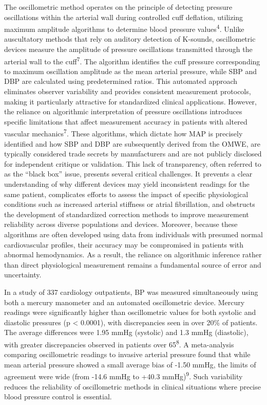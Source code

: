 \documentclass[
  12pt,
  letterpaper,
  openany,
  oneside]{book}
\begin{document}
The oscillometric method operates on the principle of detecting pressure
oscillations within the arterial wall during controlled cuff deflation,
utilizing maximum amplitude algorithms to determine blood pressure
values\textsuperscript{4}. Unlike auscultatory methods that rely on
auditory detection of K-sounds, oscillometric devices measure the
amplitude of pressure oscillations transmitted through the arterial wall
to the cuff\textsuperscript{7}. The algorithm identifies the cuff
pressure corresponding to maximum oscillation amplitude as the mean
arterial pressure, while SBP and DBP are calculated using predetermined
ratios. This automated approach eliminates observer variability and
provides consistent measurement protocols, making it particularly
attractive for standardized clinical applications. However, the reliance
on algorithmic interpretation of pressure oscillations introduces
specific limitations that affect measurement accuracy in patients with
altered vascular mechanics\textsuperscript{7}. These algorithms, which
dictate how MAP is precisely identified and how SBP and DBP are
subsequently derived from the OMWE, are typically considered trade
secrets by manufacturers and are not publicly disclosed for independent
critique or validation. This lack of transparency, often referred to as
the ``black box'' issue, presents several critical challenges. It
prevents a clear understanding of why different devices may yield
inconsistent readings for the same patient, complicates efforts to
assess the impact of specific physiological conditions such as increased
arterial stiffness or atrial fibrillation, and obstructs the development
of standardized correction methods to improve measurement reliability
across diverse populations and devices. Moreover, because these
algorithms are often developed using data from individuals with presumed
normal cardiovascular profiles, their accuracy may be compromised in
patients with abnormal hemodynamics. As a result, the reliance on
algorithmic inference rather than direct physiological measurement
remains a fundamental source of error and uncertainty.

In a study of 337 cardiology outpatients, BP was measured simultaneously
using both a mercury manometer and an automated oscillometric device.
Mercury readings were significantly higher than oscillometric values for
both systolic and diastolic pressures (p \textless{} 0.0001), with
discrepancies seen in over 20\% of patients. The average differences
were 1.95 mmHg (systolic) and 1.3 mmHg (diastolic), with greater
discrepancies observed in patients over 65\textsuperscript{8}. A
meta-analysis comparing oscillometric readings to invasive arterial
pressure found that while mean arterial pressure showed a small average
bias of -1.50 mmHg, the limits of agreement were wide (from -14.6 mmHg
to +40.3 mmHg)\textsuperscript{9}. Such variability reduces the
reliability of oscillometric methods in clinical situations where
precise blood pressure control is essential.
\end{document}
